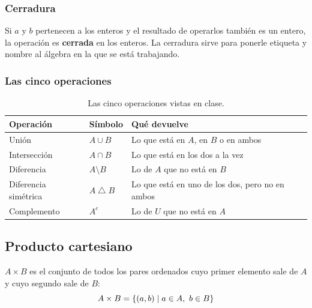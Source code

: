 \documentclass[11pt,letterpaper]{article}
\begin{document}
\subsubsection*{Cerradura}

Si $a$ y $b$ pertenecen a los enteros y el resultado de operarlos
también es un entero, la operación es \textbf{cerrada} en los enteros.
La cerradura sirve para ponerle etiqueta y nombre al álgebra en la que
se está trabajando.

\subsubsection*{Las cinco operaciones}

\begin{table}[htbp]
    \centering
    \begin{tabular}{llp{6cm}}
        \toprule
        \textbf{Operación} & \textbf{Símbolo} & \textbf{Qué devuelve}\\
        \midrule
        Unión                & $A \cup B$
          & Lo que está en $A$, en $B$ o en ambos \\
        Intersección         & $A \cap B$
          & Lo que está en los dos a la vez \\
        Diferencia           & $A \setminus B$
          & Lo de $A$ que no está en $B$ \\
        Diferencia simétrica & $A \mathbin{\triangle} B$
          & Lo que está en uno de los dos, pero no en ambos \\
        Complemento          & $A^{c}$
          & Lo de $U$ que no está en $A$ \\
        \bottomrule
    \end{tabular}
    \caption{Las cinco operaciones vistas en clase.}
    \label{tab:operaciones}
\end{table}


\subsection*{Producto cartesiano}

\begin{definicion}
    $A \times B$ es el conjunto de todos los pares ordenados cuyo
    primer elemento sale de $A$ y cuyo segundo sale de $B$:
    \[
        A \times B = \left\{ (a, b) \mid a \in A,\ b \in B \right\}
    \]
\end{definicion}
\end{document}
